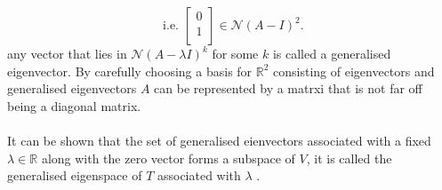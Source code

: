 \documentclass{report}
\begin{document}
\[
	 \text{ i.e. } \begin{bmatrix}
	 0\\
	 1\\
	 \end{bmatrix}
	  \in \mathcal{N} \left( A - I   \right)        ^2
.\] 
any vector that lies in $  \mathcal{N} \left(  A - \lambda I   \right) ^{k} $  for some $ k$ is called a generalised eigenvector. By carefully choosing a basis for $ \mathbb{R} ^2$ consisting of eigenvectors and generalised eigenvectors $ A$ can be represented by a matrxi that is not far off being a diagonal matrix.\\
\\
   It can be shown that the set of generalised eienvectors associated with a fixed $ \lambda \in \mathbb{R} $ along with the zero vector forms a subspace of $ V$, it is called the generalised eigenspace of $ T $ associated with $ \lambda$ .
   \\
   \\
\end{document}
